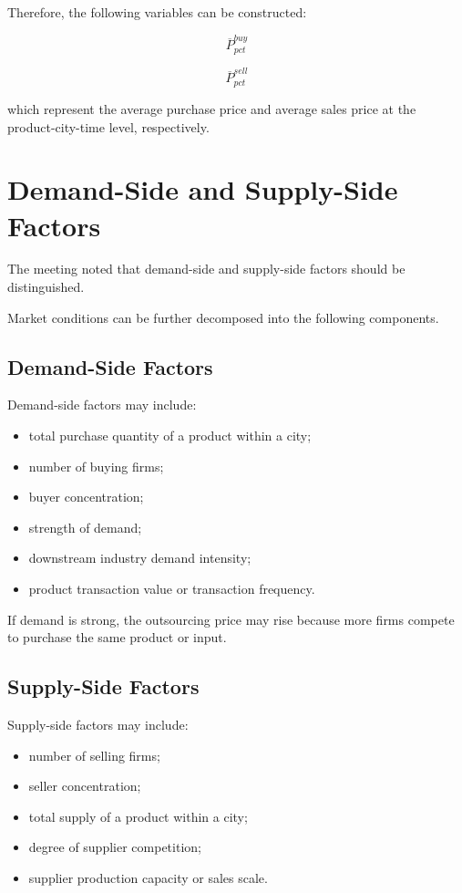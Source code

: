 \documentclass[11pt,a4paper]{article}
\begin{document}
Therefore, the following variables can be constructed:

\[
\overline{P}^{buy}_{p c t}
\]

\[
\overline{P}^{sell}_{p c t}
\]

which represent the average purchase price and average sales price at the product-city-time level, respectively.

\section{Demand-Side and Supply-Side Factors}

The meeting noted that demand-side and supply-side factors should be distinguished.

Market conditions can be further decomposed into the following components.

\subsection{Demand-Side Factors}

Demand-side factors may include:

\begin{itemize}
    \item total purchase quantity of a product within a city;
    \item number of buying firms;
    \item buyer concentration;
    \item strength of demand;
    \item downstream industry demand intensity;
    \item product transaction value or transaction frequency.
\end{itemize}

If demand is strong, the outsourcing price may rise because more firms compete to purchase the same product or input.

\subsection{Supply-Side Factors}

Supply-side factors may include:

\begin{itemize}
    \item number of selling firms;
    \item seller concentration;
    \item total supply of a product within a city;
    \item degree of supplier competition;
    \item supplier production capacity or sales scale.
\end{itemize}
\end{document}
